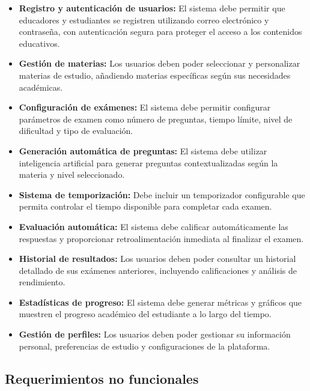 \documentclass[12pt,a4paper]{report}
\begin{document}
\begin{itemize}
\item \textbf{Registro y autenticación de usuarios:} El sistema debe permitir que educadores y estudiantes se registren utilizando correo electrónico y contraseña, con autenticación segura para proteger el acceso a los contenidos educativos.

\item \textbf{Gestión de materias:} Los usuarios deben poder seleccionar y personalizar materias de estudio, añadiendo materias específicas según sus necesidades académicas.

\item \textbf{Configuración de exámenes:} El sistema debe permitir configurar parámetros de examen como número de preguntas, tiempo límite, nivel de dificultad y tipo de evaluación.

\item \textbf{Generación automática de preguntas:} El sistema debe utilizar inteligencia artificial para generar preguntas contextualizadas según la materia y nivel seleccionado.

\item \textbf{Sistema de temporización:} Debe incluir un temporizador configurable que permita controlar el tiempo disponible para completar cada examen.

\item \textbf{Evaluación automática:} El sistema debe calificar automáticamente las respuestas y proporcionar retroalimentación inmediata al finalizar el examen.

\item \textbf{Historial de resultados:} Los usuarios deben poder consultar un historial detallado de sus exámenes anteriores, incluyendo calificaciones y análisis de rendimiento.

\item \textbf{Estadísticas de progreso:} El sistema debe generar métricas y gráficos que muestren el progreso académico del estudiante a lo largo del tiempo.

\item \textbf{Gestión de perfiles:} Los usuarios deben poder gestionar su información personal, preferencias de estudio y configuraciones de la plataforma.
\end{itemize}

\subsection{Requerimientos no funcionales}
\end{document}

